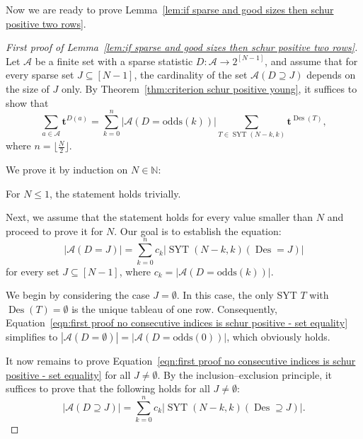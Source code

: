 \documentclass[11pt]{article}
\theoremstyle{definition}
\numberwithin{equation}{section}
\newcommand{\Des}{\operatorname{Des}}
\newcommand{\Syt}{\operatorname{SYT}}
\newcommand{\NN}{\mathbb{N}}
\newcommand{\A}{\mathcal{A}}
\newcommand{\odds}{\mathrm{odds}}
\begin{document}
Now we are ready to prove Lemma~\ref{lem:if sparse and good sizes then schur positive two rows}.
\begin{proof}[First proof of Lemma~\ref{lem:if sparse and good sizes then schur positive two rows}]
    Let $\A$ be a finite set with a sparse statistic $D:\A \to 2^{[N-1]}$, and assume that for every sparse set $J \subseteq [N-1]$, the cardinality of the set $\A(D \supseteq J)$ depends on the size of $J$ only.
    By Theorem~\ref{thm:criterion schur positive young}, it suffices to show that
    \begin{equation}\label{eqn:first proof no consecutive indices is schur positive - generating function}
        \sum_{a \in \A} \boldsymbol{t}^{D(a)} = \sum_{k=0}^n |\A(D=\odds(k))| \sum_{T \in \Syt(N-k,k)} \boldsymbol{t}^{\Des(T)},
    \end{equation}
    where $n = \lfloor\frac{N}{2}\rfloor$.
    
    We prove it by induction on $N \in \NN$:
    
    For $N \le 1$, the statement holds trivially.
    
    Next, we assume that the statement holds for every value smaller than $N$ and proceed to prove it for $N$. Our goal is to establish the equation:
    \begin{equation}\label{eqn:first proof no consecutive indices is schur positive - set equality}
        \left|\A(D=J)\right| = \sum_{k=0}^n c_k \left|\Syt(N-k,k)(\Des=J)\right|
    \end{equation}
    for every set $J \subseteq [N-1]$, where $c_k = \left|\A(D=\odds(k))\right|$.
    
    We begin by considering the case $J = \emptyset$. In this case, the only SYT $T$ with $\Des(T) = \emptyset$ is the unique tableau of one row. Consequently, Equation~\eqref{eqn:first proof no consecutive indices is schur positive - set equality} simplifies to $\left|\A(D=\emptyset)\right| = \left|\A(D=\odds(0))\right|$, which obviously holds.
    
    It now remains to prove Equation~\eqref{eqn:first proof no consecutive indices is schur positive - set equality} for all $J \ne \emptyset$. By  the inclusion--exclusion principle, it suffices to prove that the following holds for all $J \ne \emptyset$:
    \begin{equation}\label{eqn:first proof no consecutive indices is schur positive - set containment}
        \left|\A(D \supseteq J)\right| = \sum_{k=0}^n c_k \left|\Syt(N-k,k)(\Des \supseteq J)\right|.
    \end{equation}
    

\end{proof}
\end{document}
